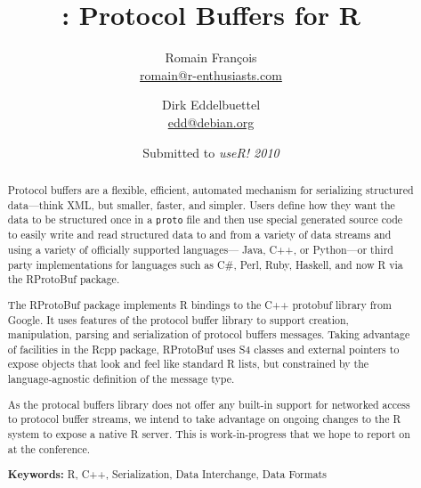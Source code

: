 \documentclass[11pt]{article}
\author{
Romain Fran\c{c}ois\\ {\small \url{romain@r-enthusiasts.com} } \and
Dirk Eddelbuettel\\ {\small \url{edd@debian.org} }
}
\title{\pkg{RProtoBuf}: Protocol Buffers for R }
\date{Submitted to \textsl{useR! 2010}}
\newcommand{\proglang}[1]{\textsf{#1}}
\newcommand{\pkg}[1]{{\fontseries{b}\selectfont #1}}
\begin{document}
\maketitle
\thispagestyle{empty}
\begin{abstract}
  \addtolength{\parskip}{\baselineskip} 	%
  \noindent %
  Protocol buffers are a flexible, efficient, automated mechanism for
  serializing structured data---think XML, but smaller, faster, and simpler.
  Users define how they want the data to be structured once in a
  \texttt{proto} file and then use special generated source code to easily
  write and read structured data to and from a variety of data streams and
  using a variety of officially supported languages--- \proglang{Java},
  \proglang{C++}, or \proglang{Python}---or third party implementations for
  languages such as \proglang{C\#}, \proglang{Perl}, \proglang{Ruby},
  \proglang{Haskell}, and now \proglang{R} via the \pkg{RProtoBuf} package.
  
  The \pkg{RProtoBuf} package implements \proglang{R} bindings to the
  \proglang{C++} protobuf library from Google. It uses features of the
  protocol buffer library to support creation, manipulation, parsing and
  serialization of protocol buffers messages. Taking advantage of facilities
  in the \pkg{Rcpp} package, \pkg{RProtoBuf} uses S4 classes and external
  pointers to expose objects that look and feel like standard \proglang{R}
  lists, but constrained by the language-agnostic definition of the message
  type.
  
  As the protocal buffers library does not offer any built-in support
  for networked access to protocol buffer streams, we intend to take
  advantage on ongoing changes to the \proglang{R} system to expose a native
  \proglang{R} server. This is work-in-progress that we hope to report on at
  the conference.

  \noindent \textbf{Keywords:}  
  \proglang{R}, \proglang{C++}, Serialization, Data Interchange, Data Formats
\end{abstract}
\end{document}
